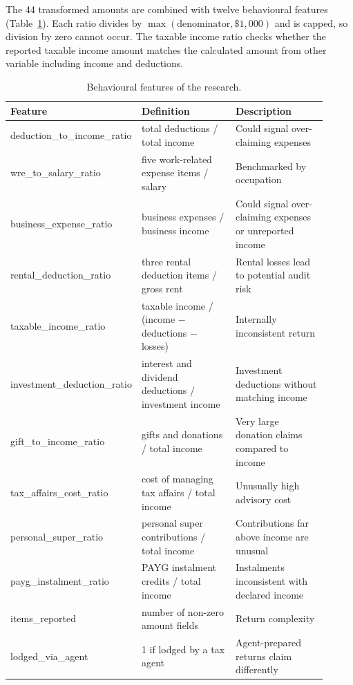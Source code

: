 The 44 transformed amounts are combined with twelve behavioural features (Table~\ref{tab:features}). Each ratio divides by $\max(\text{denominator}, \$1{,}000)$ and is capped, so division by zero cannot occur. The taxable income ratio checks whether the reported taxable income amount matches the calculated amount from other variable including income and deductions.

\begin{table}[H]
    \centering
    \caption{Behavioural features of the research.}
    \label{tab:features}
    \small
    \begin{tabular}{p{0.30\linewidth} p{0.31\linewidth} p{0.30\linewidth}}
        \toprule
        Feature & Definition & Description \\
        \midrule
        deduction\_to\_income\_ratio & total deductions / total income & Could signal over-claiming expenses \\
        wre\_to\_salary\_ratio & five work-related expense items / salary & Benchmarked by occupation \\
        business\_expense\_ratio & business expenses / business income & Could signal over-claiming expenses or unreported income \\
        rental\_deduction\_ratio & three rental deduction items / gross rent & Rental losses lead to potential audit risk \\
        taxable\_income\_ratio & taxable income / (income $-$ deductions $-$ losses) & Internally inconsistent return \\
        investment\_deduction\_ratio & interest and dividend deductions / investment income & Investment deductions without matching income \\
        gift\_to\_income\_ratio & gifts and donations / total income & Very large donation claims compared to income \\
        tax\_affairs\_cost\_ratio & cost of managing tax affairs / total income & Unusually high advisory cost \\
        personal\_super\_ratio & personal super contributions / total income & Contributions far above income are unusual \\
        payg\_instalment\_ratio & PAYG instalment credits / total income & Instalments inconsistent with declared income \\
        items\_reported & number of non-zero amount fields & Return complexity \\
        lodged\_via\_agent & 1 if lodged by a tax agent & Agent-prepared returns claim differently \\
        \bottomrule
    \end{tabular}
\end{table}

